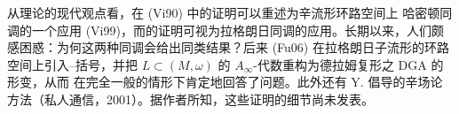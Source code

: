 \begin{remark}
\label{rem:audin-modern-perspective}
从\personFloer{}理论的现代观点看，\personViterbo{}在 (Vi90) 中的证明可以重述为辛流形环路空间上
哈密顿\personFloer{}同调的一个应用 (Vi99)，而\personPolterovich{}的证明可视为拉格朗日\personFloer{}同调的应用。长期以来，人们颇感困惑：为何这两种\personFloer{}同调会给出同类结果？后来
\personFukaya{} (Fu06) 在拉格朗日子流形的环路空间上引入\personChas{}--\personSullivan{}括号，并把
$L\subset(M,\omega)$ 的 $A_\infty$-代数重构为德拉姆复形之 DGA 的形变，从而
在完全一般的情形下肯定地回答了\personAudin{}问题。此外还有 Y. \personEliashberg{}倡导的辛场论
方法（私人通信，2001）。据作者所知，这些证明的细节尚未发表。
\end{remark}
